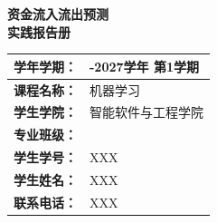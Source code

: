 \documentclass[12pt,a4paper]{article}
\begin{document}
\begin{center}
    {\heiti %

{\Huge \textbf{资金流入流出预测}} \\[0.8cm]
{\Huge \textbf{实践报告册}} \\[2.5cm]
  \vspace{4cm}
    \renewcommand{\arraystretch}{1.8}
\begin{tabular}{|p{4cm}|>{\centering\arraybackslash}p{8cm}|}

        \hline
        \textbf{学年学期：} & 2026-2027学年 第1学期 \\
        \hline
        \textbf{课程名称：} & 机器学习 \\
        \hline
        \textbf{学生学院：} & 智能软件与工程学院 \\
        \hline
        \textbf{专业班级：} &  \\
        \hline
        \textbf{学生学号：} & XXX \\
        \hline
        \textbf{学生姓名：} & XXX \\
        \hline
        \textbf{联系电话：} & XXX \\
        \hline
    \end{tabular}

    } %
\end{center}


\newpage
\end{document}
